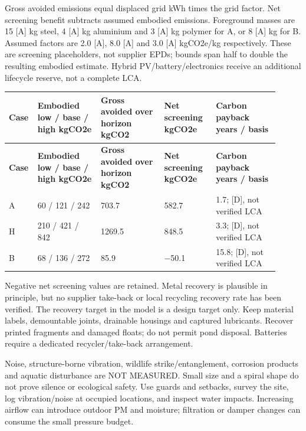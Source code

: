 \documentclass[11pt,a4paper]{article}
\begin{document}
Gross avoided emissions equal displaced grid kWh times the grid factor. Net screening benefit subtracts assumed embodied emissions. Foreground masses are \num{15} [A] kg steel, \num{4} [A] kg aluminium and \num{3} [A] kg polymer for A, or \num{8} [A] kg for B. Assumed factors are \num{2.0} [A], \num{8.0} [A] and \num{3.0} [A] kgCO2e/kg respectively. These are screening placeholders, not supplier EPDs; bounds span half to double the resulting embodied estimate. Hybrid PV/battery/electronics receive an additional lifecycle reserve, not a complete LCA.

{\small
\setlength{\tabcolsep}{3pt}\renewcommand{\arraystretch}{1.18}
\begin{longtable}{@{}>{\raggedright\arraybackslash}p{0.0552\linewidth}>{\raggedright\arraybackslash}p{0.2298\linewidth}>{\raggedright\arraybackslash}p{0.2206\linewidth}>{\raggedright\arraybackslash}p{0.1838\linewidth}>{\raggedright\arraybackslash}p{0.2206\linewidth}@{}}
\toprule \textbf{Case} & \textbf{Embodied low / base / high kgCO2e} & \textbf{Gross avoided over horizon kgCO2} & \textbf{Net screening kgCO2e} & \textbf{Carbon payback years / basis} \\ \midrule
\endfirsthead\toprule \textbf{Case} & \textbf{Embodied low / base / high kgCO2e} & \textbf{Gross avoided over horizon kgCO2} & \textbf{Net screening kgCO2e} & \textbf{Carbon payback years / basis} \\ \midrule
\endhead\bottomrule\endfoot
A & \num{60} / \num{121} / \num{242} & \num{703.7} & \num{582.7} & \num{1.7}; [D], not verified LCA \\
H & \num{210} / \num{421} / \num{842} & \num{1269.5} & \num{848.5} & \num{3.3}; [D], not verified LCA \\
B & \num{68} / \num{136} / \num{272} & \num{85.9} & \num{-50.1} & \num{15.8}; [D], not verified LCA \\
\end{longtable}}
Negative net screening values are retained. Metal recovery is plausible in principle, but no supplier take-back or local recycling recovery rate has been verified. The recovery target in the model is a design target only. Keep material labels, demountable joints, drainable housings and captured lubricants. Recover printed fragments and damaged floats; do not permit pond disposal. Batteries require a dedicated recycler/take-back arrangement.

Noise, structure-borne vibration, wildlife strike/entanglement, corrosion products and aquatic disturbance are NOT MEASURED. Small size and a spiral shape do not prove silence or ecological safety. Use guards and setbacks, survey the site, log vibration/noise at occupied locations, and inspect water impacts. Increasing airflow can introduce outdoor PM and moisture; filtration or damper changes can consume the small pressure budget. \cite{windguide,materials,faoquality}
\end{document}
